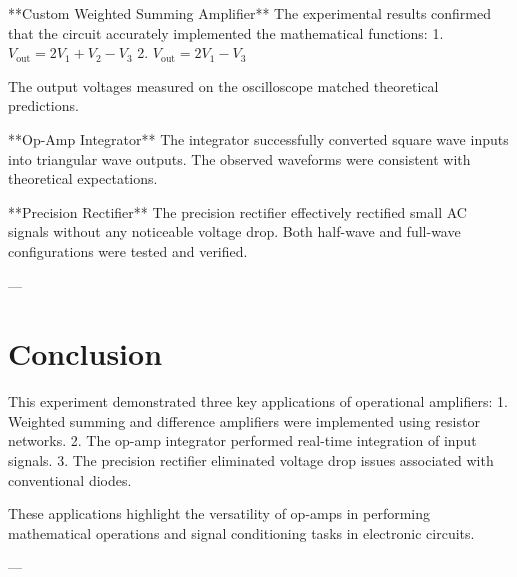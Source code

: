 \documentclass[12pt]{article}
\begin{document}
 **Custom Weighted Summing Amplifier**
The experimental results confirmed that the circuit accurately implemented the mathematical functions:
1. \(V_{\text{out}} = 2V_1 + V_2 - V_3\)
2. \(V_{\text{out}} = 2V_1 - V_3\)

The output voltages measured on the oscilloscope matched theoretical predictions.

 **Op-Amp Integrator**
The integrator successfully converted square wave inputs into triangular wave outputs. The observed waveforms were consistent with theoretical expectations.

 **Precision Rectifier**
The precision rectifier effectively rectified small AC signals without any noticeable voltage drop. Both half-wave and full-wave configurations were tested and verified.

---

\section{  Conclusion}
This experiment demonstrated three key applications of operational amplifiers:
1. Weighted summing and difference amplifiers were implemented using resistor networks.
2. The op-amp integrator performed real-time integration of input signals.
3. The precision rectifier eliminated voltage drop issues associated with conventional diodes.

These applications highlight the versatility of op-amps in performing mathematical operations and signal conditioning tasks in electronic circuits.

---
\end{document}

